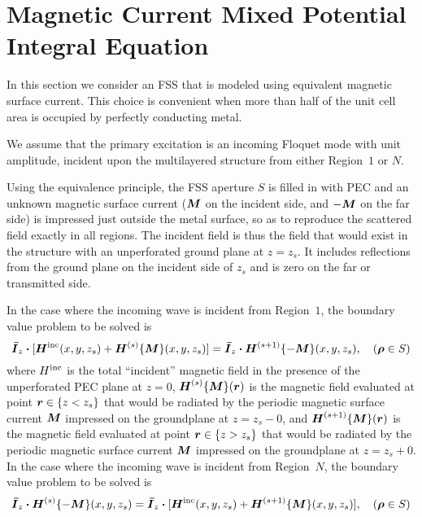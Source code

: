\section{Magnetic Current Mixed Potential Integral Equation}
In this section we consider an FSS that is modeled using equivalent
magnetic surface current.  This choice is convenient when more than
half of the unit cell area is occupied by perfectly conducting metal.

We assume that the primary excitation is an 
incoming Floquet mode with unit amplitude, incident
upon the multilayered structure from either Region~$1$ or $N.$

Using the equivalence principle, the FSS aperture $S$ is filled in with PEC
and an unknown magnetic surface current ($\boldsymbol{M}$ on the incident side,
and $-\boldsymbol{M}$ on the far side) is impressed just
outside the metal surface, so as to reproduce the scattered
field exactly in all regions.  The incident field is thus the field
that would exist in the structure with an unperforated ground plane at
$z=z_s$.  It includes reflections from the ground plane on the
incident side of $z_s$ and is zero on the far or transmitted side.

In the case where the incoming wave is incident from Region~$1$, the
boundary value problem to be solved is 
\begin{equation}
  \boldsymbol{\bar{I}}_z \boldsymbol{\cdot} [\boldsymbol{H}^{\text{inc}}(x,y,z_s) + \boldsymbol{H}^{(s)}\{\boldsymbol{M}\}(x,y,z_s)]
  =   \boldsymbol{\bar{I}}_z \boldsymbol{\cdot} \boldsymbol{H}^{(s+1)}\{-\boldsymbol{M}\}(x,y,z_s), 
    \quad (\boldsymbol{\rho} \in S)
\end{equation}
where 
$H^{\text{inc}}$ is the total ``incident'' magnetic field in the presence of
the unperforated PEC plane at $z=0$,
$\boldsymbol{H}^{(s)}\{\boldsymbol{M}\}(\boldsymbol{r})$ is the magnetic field evaluated at point $\boldsymbol{r} \in \{z<z_s\}$ that
would be radiated by the periodic magnetic surface current 
$\boldsymbol{M}$ impressed on the groundplane at $z=z_s-0$, and 
$\boldsymbol{H}^{(s+1)}\{\boldsymbol{M}\}(\boldsymbol{r})$ is the magnetic field evaluated at point $\boldsymbol{r} \in \{z>z_s\}$ that
would be radiated by the periodic magnetic surface current 
$\boldsymbol{M}$ impressed on the groundplane at $z=z_s+0.$
In the case where the incoming wave is incident from Region~$N$, the
boundary value problem to be solved is 
\begin{equation}
  \boldsymbol{\bar{I}}_z \boldsymbol{\cdot} \boldsymbol{H}^{(s)}\{-\boldsymbol{M}\}(x,y,z_s)
  =   \boldsymbol{\bar{I}}_z \boldsymbol{\cdot} [\boldsymbol{H}^{\text{inc}}(x,y,z_s) + \boldsymbol{H}^{(s+1)}\{\boldsymbol{M}\}(x,y,z_s)], 
    \quad (\boldsymbol{\rho} \in S)
\end{equation}

